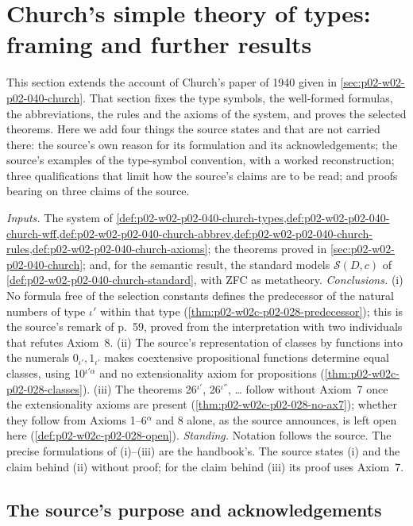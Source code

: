 \section{Church's simple theory of types: framing and further results}
\label{sec:p02-w02c-p02-028-church-supplement}

This section extends the account of Church's paper of 1940
\cite{Church1940} given in \cref{sec:p02-w02-p02-040-church}.  That section
fixes the type symbols, the well-formed formulas, the abbreviations, the
rules and the axioms of the system, and proves the selected theorems.  Here
we add four things the source states and that are not carried there: the
source's own reason for its formulation and its acknowledgements; the
source's examples of the type-symbol convention, with a worked
reconstruction; three qualifications that limit how the source's claims are
to be read; and proofs bearing on three claims of the source.

\emph{Inputs.}  The system of
\cref{def:p02-w02-p02-040-church-types,def:p02-w02-p02-040-church-wff,def:p02-w02-p02-040-church-abbrev,def:p02-w02-p02-040-church-rules,def:p02-w02-p02-040-church-axioms};
the theorems proved in \cref{sec:p02-w02-p02-040-church}; and, for the
semantic result, the standard models
\(\mathcal S(D,c)\) of \cref{def:p02-w02-p02-040-church-standard}, with ZFC
as metatheory.
\emph{Conclusions.}  (i) No formula free of the selection constants defines
the predecessor of the natural numbers of type \(\iota'\) within that type
(\cref{thm:p02-w02c-p02-028-predecessor}); this is the source's remark of
p.~59, proved from the interpretation with two individuals that refutes
Axiom~8.  (ii) The source's representation of classes by functions into the
numerals \(0_{\iota'},1_{\iota'}\) makes coextensive propositional functions
determine equal classes, using 10\(^{\iota'\alpha}\) and no extensionality
axiom for propositions (\cref{thm:p02-w02c-p02-028-classes}).  (iii) The
theorems 26\(^{\iota'}\), 26\(^{\iota''}\), \ldots{} follow without Axiom~7
once the extensionality axioms are present
(\cref{thm:p02-w02c-p02-028-no-ax7}); whether they follow from
Axioms 1--6\(^\alpha\) and 8 alone, as the source announces, is left open
here (\cref{def:p02-w02c-p02-028-open}).
\emph{Standing.}  Notation follows the source.  The precise formulations of
(i)--(iii) are the handbook's.  The source states (i) and the claim behind
(ii) without proof; for the claim behind (iii) its proof uses Axiom~7.

\subsection{The source's purpose and acknowledgements}

